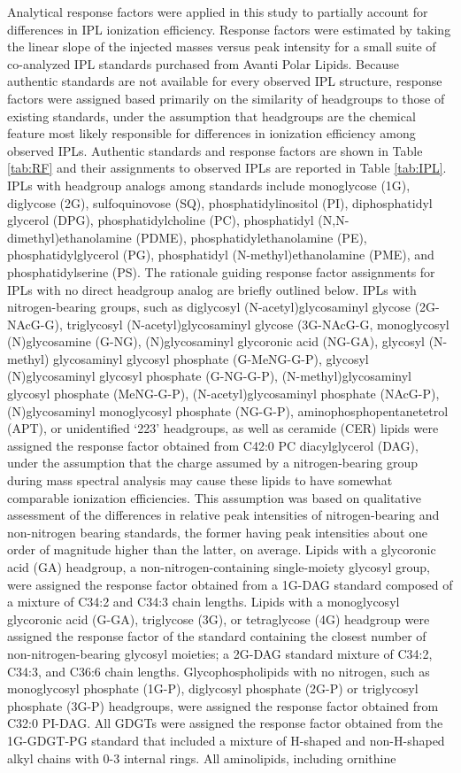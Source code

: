 Analytical response factors were applied in this study to partially account for differences in IPL ionization efficiency. Response factors were estimated by taking the linear slope of the injected masses versus peak intensity for a small suite of co-analyzed IPL standards purchased from Avanti Polar Lipids. Because authentic standards are not available for every observed IPL structure, response factors were assigned based primarily on the similarity of headgroups to those of existing standards, under the assumption that headgroups are the chemical feature most likely responsible for differences in ionization efficiency among observed IPLs. Authentic standards and response factors are shown in Table \ref{tab:RF} and their assignments to observed IPLs are reported in Table \ref{tab:IPL}. IPLs with headgroup analogs among standards include monoglycose (1G), diglycose (2G), sulfoquinovose (SQ), phosphatidylinositol (PI), diphosphatidyl glycerol (DPG), phosphatidylcholine (PC), phosphatidyl (N,N-dimethyl)ethanolamine (PDME), phosphatidylethanolamine (PE), phosphatidylglycerol (PG), phosphatidyl (N-methyl)ethanolamine (PME), and phosphatidylserine (PS). The rationale guiding response factor assignments for IPLs with no direct headgroup analog are briefly outlined below. IPLs with nitrogen-bearing groups, such as diglycosyl (N-acetyl)glycosaminyl glycose (2G-NAcG-G), triglycosyl (N-acetyl)glycosaminyl glycose (3G-NAcG-G, monoglycosyl (N)glycosamine (G-NG), (N)glycosaminyl glycoronic acid (NG-GA), glycosyl (N-methyl) glycosaminyl glycosyl phosphate (G-MeNG-G-P), glycosyl (N)glycosaminyl glycosyl phosphate (G-NG-G-P), (N-methyl)glycosaminyl glycosyl phosphate (MeNG-G-P), (N-acetyl)glycosaminyl phosphate (NAcG-P), (N)glycosaminyl monoglycosyl phosphate (NG-G-P), aminophosphopentanetetrol (APT), or unidentified `223' headgroups, as well as ceramide (CER) lipids were assigned the response factor obtained from C42:0 PC diacylglycerol (DAG), under the assumption that the charge assumed by a nitrogen-bearing group during mass spectral analysis may cause these lipids to have somewhat comparable ionization efficiencies. This assumption was based on qualitative assessment of the differences in relative peak intensities of nitrogen-bearing and non-nitrogen bearing standards, the former having peak intensities about one order of magnitude higher than the latter, on average. Lipids with a glycoronic acid (GA) headgroup, a non-nitrogen-containing single-moiety glycosyl group, were assigned the response factor obtained from a 1G-DAG standard composed of a mixture of C34:2 and C34:3 chain lengths. Lipids with a monoglycosyl glycoronic acid (G-GA), triglycose (3G), or tetraglycose (4G) headgroup were assigned the response factor of the standard containing the closest number of non-nitrogen-bearing glycosyl moieties; a 2G-DAG standard mixture of C34:2, C34:3, and C36:6 chain lengths. Glycophospholipids with no nitrogen, such as monoglycosyl phosphate (1G-P), diglycosyl phosphate (2G-P) or triglycosyl phosphate (3G-P) headgroups, were assigned the response factor obtained from C32:0 PI-DAG. All GDGTs were assigned the response factor obtained from the 1G-GDGT-PG standard that included a mixture of H-shaped and non-H-shaped alkyl chains with 0-3 internal rings. All aminolipids, including ornithine 